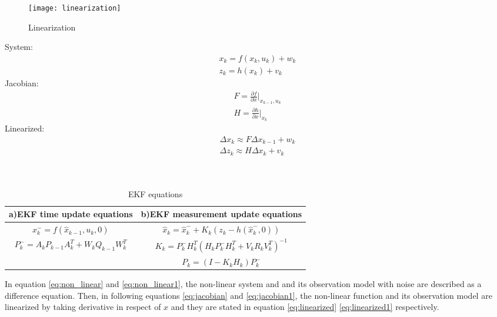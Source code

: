 \begin{wrapfigure}[15]{l}{0.4\textwidth}
  \begin{center}
    \texttt{[image: linearization]}
  \end{center}
  \caption{Linearization}
  \label{fig:linearization}
\end{wrapfigure}
\hspace{-13pt}System:
\vspace{-33pt}
\begin{eqnarray}\label{eq:non_linear}
    x_k=f(x_k,u_k)+w_k\\
    z_k=h(x_k)+v_k  \label{eq:non_linear1} 
\end{eqnarray}
\vspace{-13pt}
Jacobian:
\vspace{-20pt}
\begin{eqnarray}\label{eq:jacobian}
F=\frac{\partial f}{\partial x}|_{x_{k-1},u_k}\\
H=\frac{\partial h}{\partial x}|_{x_k}\label{eq:jacobian1}    
\end{eqnarray}
\vspace{-20pt}
Linearized:
\vspace{-20pt}
\begin{eqnarray}\label{eq:linearized}
\Delta x_k \approx F\Delta x_{k-1} + w_k\\
\Delta z_k \approx H\Delta x_{k} + v_k\label{eq:linearized1}
\end{eqnarray}
\\
\\
\begin{table}[h]
\renewcommand{\arraystretch}{2}
    \centering
    \begin{tabular}{| c | c |}
    \hline
        \textbf{a)EKF time update equations}            &\textbf{b)EKF measurement update equations}\\
    \hline
         $x_k^-=f(\hat x_{k-1},u_k,0)$        &$\hat x_k= \hat x_k^-+K_k(z_k-h(\hat x_k^-,0))$\\
          $P_k^-=A_kP_{k-1}A_k^T+W_kQ_{k-1}W_k^T$        &$K_k=P_k^-H_k^T(H_kP_k^-H_k^T+V_kR_kV_k^T)^{-1}$\\ 
          &$P_k=(I-K_kH_k)P_k^-$\\
    \hline
    \end{tabular}
\caption{EKF equations}%
\label{tab:ekf_eq}
\end{table}
\par In equation \eqref{eq:non_linear} and \eqref{eq:non_linear1}, the non-linear system and and its observation model with noise are described as a difference equation. Then, in following equations \eqref{eq:jacobian} and \eqref{eq:jacobian1}, the non-linear function and its observation model are linearized by taking derivative in respect of $x$ and they are stated in equation \eqref{eq:linearized} \eqref{eq:linearized1} respectively.
